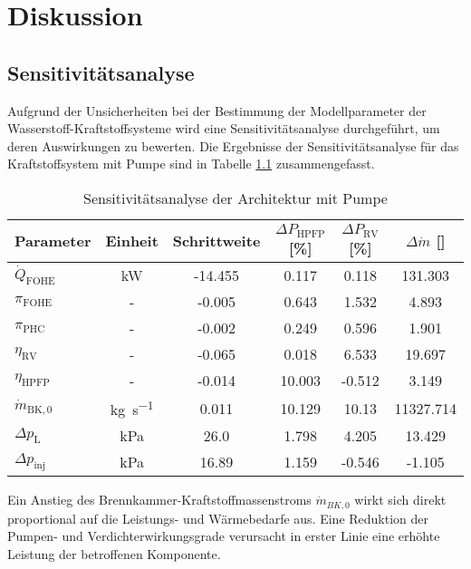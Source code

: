 \chapter{Diskussion} \label{chap:disk}

\section{Sensitivitätsanalyse}

Aufgrund der Unsicherheiten bei der Bestimmung der Modellparameter der Wasserstoff-Kraftstoffsysteme wird eine Sensitivitätsanalyse durchgeführt, um deren Auswirkungen zu bewerten. Die Ergebnisse der Sensitivitätsanalyse für das Kraftstoffsystem mit Pumpe sind in Tabelle \ref{Tab:senspump} zusammengefasst.

\begin{table}[ht]
    \centering
	\caption{Sensitivitätsanalyse der Architektur mit Pumpe}
	\begin{tabular} {|l|c|c|c|c|c|} \hline%
		Parameter & Einheit & Schrittweite & $ \Delta P_\mathrm{HPFP}$ [\%] & $ \Delta P_\mathrm{RV}$ [\%] & $ \Delta \dot{m}$ [\textperthousand] \\ \hline\hline%
$\dot{Q}_\mathrm{FOHE}$ & \si{\kilo\W} & -14.455 & 0.117 & 0.118 & 131.303 \\ \hline 
$\pi_\mathrm{FOHE}$ & - & -0.005 & 0.643 & 1.532 & 4.893 \\ \hline 
$\pi_\mathrm{PHC}$ & - & -0.002 & 0.249 & 0.596 & 1.901 \\ \hline 
$\eta_\mathrm{RV}$ & - & -0.065 & 0.018 & 6.533 & 19.697 \\ \hline 
$\eta_\mathrm{HPFP}$ & - & -0.014 & 10.003 & -0.512 & 3.149 \\ \hline 
$\dot{m}_\mathrm{BK,0}$ & \si{\kg\per\s} & 0.011 & 10.129 & 10.13 & 11327.714 \\ \hline 
$\Delta p_\mathrm{L}$ & \si{\kilo\Pa} & 26.0 & 1.798 & 4.205 & 13.429 \\ \hline 
$\Delta p_\mathrm{inj}$ & \si{\kilo\Pa} & 16.89 & 1.159 & -0.546 & -1.105 \\ \hline 

	\end{tabular}	
    \label{Tab:senspump}%
\end{table}
\FloatBarrier 

Ein Anstieg des Brennkammer-Kraftstoffmassenstroms $\dot{m}_{BK,0}$ wirkt sich direkt proportional auf die Leistungs- und Wärmebedarfe aus. Eine Reduktion der Pumpen- und Verdichterwirkungsgrade verursacht in erster Linie eine erhöhte Leistung der betroffenen Komponente.


